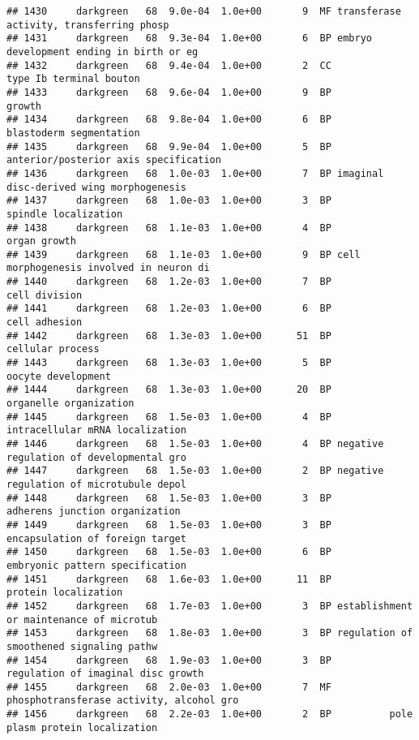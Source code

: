 \documentclass[]{article}
\begin{document}
\begin{verbatim}
## 1430     darkgreen   68  9.0e-04  1.0e+00       9  MF transferase activity, transferring phosp
## 1431     darkgreen   68  9.3e-04  1.0e+00       6  BP embryo development ending in birth or eg
## 1432     darkgreen   68  9.4e-04  1.0e+00       2  CC                  type Ib terminal bouton
## 1433     darkgreen   68  9.6e-04  1.0e+00       9  BP                                   growth
## 1434     darkgreen   68  9.8e-04  1.0e+00       6  BP                  blastoderm segmentation
## 1435     darkgreen   68  9.9e-04  1.0e+00       5  BP    anterior/posterior axis specification
## 1436     darkgreen   68  1.0e-03  1.0e+00       7  BP imaginal disc-derived wing morphogenesis
## 1437     darkgreen   68  1.0e-03  1.0e+00       3  BP                     spindle localization
## 1438     darkgreen   68  1.1e-03  1.0e+00       4  BP                             organ growth
## 1439     darkgreen   68  1.1e-03  1.0e+00       9  BP cell morphogenesis involved in neuron di
## 1440     darkgreen   68  1.2e-03  1.0e+00       7  BP                            cell division
## 1441     darkgreen   68  1.2e-03  1.0e+00       6  BP                            cell adhesion
## 1442     darkgreen   68  1.3e-03  1.0e+00      51  BP                         cellular process
## 1443     darkgreen   68  1.3e-03  1.0e+00       5  BP                       oocyte development
## 1444     darkgreen   68  1.3e-03  1.0e+00      20  BP                   organelle organization
## 1445     darkgreen   68  1.5e-03  1.0e+00       4  BP          intracellular mRNA localization
## 1446     darkgreen   68  1.5e-03  1.0e+00       4  BP negative regulation of developmental gro
## 1447     darkgreen   68  1.5e-03  1.0e+00       2  BP negative regulation of microtubule depol
## 1448     darkgreen   68  1.5e-03  1.0e+00       3  BP           adherens junction organization
## 1449     darkgreen   68  1.5e-03  1.0e+00       3  BP          encapsulation of foreign target
## 1450     darkgreen   68  1.5e-03  1.0e+00       6  BP          embryonic pattern specification
## 1451     darkgreen   68  1.6e-03  1.0e+00      11  BP                     protein localization
## 1452     darkgreen   68  1.7e-03  1.0e+00       3  BP establishment or maintenance of microtub
## 1453     darkgreen   68  1.8e-03  1.0e+00       3  BP regulation of smoothened signaling pathw
## 1454     darkgreen   68  1.9e-03  1.0e+00       3  BP       regulation of imaginal disc growth
## 1455     darkgreen   68  2.0e-03  1.0e+00       7  MF phosphotransferase activity, alcohol gro
## 1456     darkgreen   68  2.2e-03  1.0e+00       2  BP          pole plasm protein localization

\end{verbatim}
\end{document}
